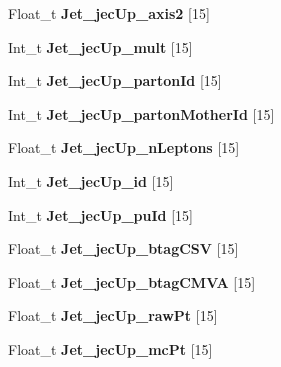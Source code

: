 \begin{DoxyCompactItemize}
Float\+\_\+t {\bfseries Jet\+\_\+jec\+Up\+\_\+axis2} \mbox{[}15\mbox{]}
\item 
\hypertarget{classMiniTree_a6f3e3200c9cd55593d43e84e37316287}{}\label{classMiniTree_a6f3e3200c9cd55593d43e84e37316287} 
Int\+\_\+t {\bfseries Jet\+\_\+jec\+Up\+\_\+mult} \mbox{[}15\mbox{]}
\item 
\hypertarget{classMiniTree_a4de0ddbc08446f386d86ab6520571ccf}{}\label{classMiniTree_a4de0ddbc08446f386d86ab6520571ccf} 
Int\+\_\+t {\bfseries Jet\+\_\+jec\+Up\+\_\+parton\+Id} \mbox{[}15\mbox{]}
\item 
\hypertarget{classMiniTree_ae0d4032ea6acaae1b2e21971f0cfda49}{}\label{classMiniTree_ae0d4032ea6acaae1b2e21971f0cfda49} 
Int\+\_\+t {\bfseries Jet\+\_\+jec\+Up\+\_\+parton\+Mother\+Id} \mbox{[}15\mbox{]}
\item 
\hypertarget{classMiniTree_a965be05e57b05bbddde43b45e8cbbf73}{}\label{classMiniTree_a965be05e57b05bbddde43b45e8cbbf73} 
Float\+\_\+t {\bfseries Jet\+\_\+jec\+Up\+\_\+n\+Leptons} \mbox{[}15\mbox{]}
\item 
\hypertarget{classMiniTree_a66f1518c5b4f7368c25f77786d8c973c}{}\label{classMiniTree_a66f1518c5b4f7368c25f77786d8c973c} 
Int\+\_\+t {\bfseries Jet\+\_\+jec\+Up\+\_\+id} \mbox{[}15\mbox{]}
\item 
\hypertarget{classMiniTree_a6f34bea9ff319d05c81806cb7f52c0c1}{}\label{classMiniTree_a6f34bea9ff319d05c81806cb7f52c0c1} 
Int\+\_\+t {\bfseries Jet\+\_\+jec\+Up\+\_\+pu\+Id} \mbox{[}15\mbox{]}
\item 
\hypertarget{classMiniTree_a3e1493e05b4535ecf173cf57af98d041}{}\label{classMiniTree_a3e1493e05b4535ecf173cf57af98d041} 
Float\+\_\+t {\bfseries Jet\+\_\+jec\+Up\+\_\+btag\+C\+SV} \mbox{[}15\mbox{]}
\item 
\hypertarget{classMiniTree_a04212b021b1d1fe6d4194c9081e2a725}{}\label{classMiniTree_a04212b021b1d1fe6d4194c9081e2a725} 
Float\+\_\+t {\bfseries Jet\+\_\+jec\+Up\+\_\+btag\+C\+M\+VA} \mbox{[}15\mbox{]}
\item 
\hypertarget{classMiniTree_a4733b56b303c2ee231e1798518e59d7f}{}\label{classMiniTree_a4733b56b303c2ee231e1798518e59d7f} 
Float\+\_\+t {\bfseries Jet\+\_\+jec\+Up\+\_\+raw\+Pt} \mbox{[}15\mbox{]}
\item 
\hypertarget{classMiniTree_a6bb4a1f40a1406a3e354a7509dfc704a}{}\label{classMiniTree_a6bb4a1f40a1406a3e354a7509dfc704a} 
Float\+\_\+t {\bfseries Jet\+\_\+jec\+Up\+\_\+mc\+Pt} \mbox{[}15\mbox{]}
\item 
\hypertarget{classMiniTree_aa6160b98289d5567e183f65c29bf63c6}{}\label{classMiniTree_aa6160b98289d5567e183f65c29bf63c6} 

\end{DoxyCompactItemize}
